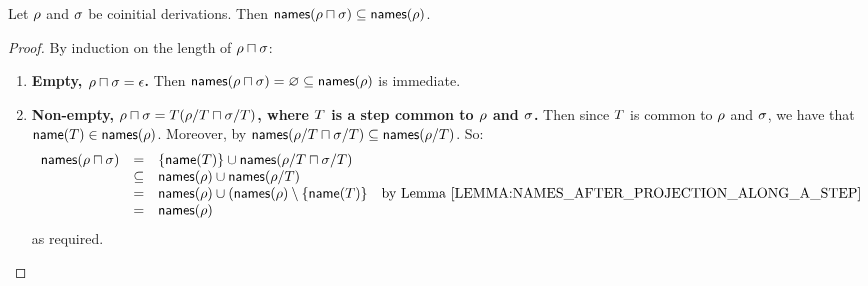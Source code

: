 \begin{lemma}
Let $\rho$ and $\sigma$ be coinitial derivations.
Then $\mathsf{names}(\rho \sqcap \sigma) \subseteq \mathsf{names}(\rho)$.
\end{lemma}
\begin{proof}
By induction on the length of $\rho \sqcap \sigma$:
\begin{enumerate}
\item {\bf Empty, $\rho \sqcap \sigma = \epsilon$.}
      Then $\mathsf{names}(\rho \sqcap \sigma) = \varnothing \subseteq \mathsf{names}(\rho)$ is immediate.
\item {\bf Non-empty, $\rho \sqcap \sigma = T(\rho/T \sqcap \sigma/T)$,
           where $T$ is a step common to $\rho$ and $\sigma$.}
      Then since $T$ is common to $\rho$ and $\sigma$,
      we have that $\mathsf{name}(T) \in \mathsf{names}(\rho)$.
      Moreover, by \ih $\mathsf{names}(\rho/T \sqcap \sigma/T) \subseteq \mathsf{names}(\rho/T)$.
      So:
      \[
        \begin{array}{rcll}
        \names(\redseq \sqcap \redseqtwo) & = & \set{\name(\redexthree)} \cup \names(\redseq/\redexthree \sqcap \redseqtwo/\redexthree) \\
                                        & \subseteq & \names(\redseq) \cup \names(\redseq/\redexthree) \\
                                        & = & \names(\redseq) \cup (\names(\redseq) \setminus \set{\name(\redexthree)} & \text{by \rlem{names_after_projection_along_a_step}} \\
                                        & = & \names(\redseq)
        \end{array}
      \]
      as required.
\end{enumerate}
\end{proof}

